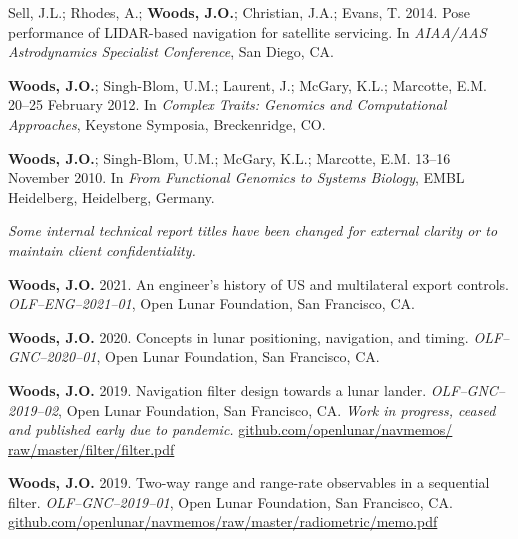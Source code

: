 \documentclass[12pt,letterpaper]{article}
\newcommand{\mhead}[1]{\leavevmode\marginpar{\sffamily\footnotesize #1}}
\begin{document}
\medskip
Sell, J.L.; Rhodes, A.; \textbf{Woods, J.O.}; Christian, J.A.; Evans, T. 2014. Pose performance of LIDAR-based navigation for satellite servicing. In \textit{AIAA/AAS Astrodynamics Specialist Conference}, San Diego, CA.

\bigskip
\mhead{Posters}%
\par\vspace{-\baselineskip}\textbf{Woods, J.O.}; Singh-Blom, U.M.; Laurent, J.; McGary, K.L.; Marcotte, E.M. 20--25 February 2012. In \textit{Complex Traits: Genomics and Computational Approaches}, Keystone Symposia, Breckenridge, CO.

\medskip
\par \textbf{Woods, J.O.}; Singh-Blom, U.M.; McGary, K.L.; Marcotte, E.M. 13--16 November 2010. In \textit{From Functional Genomics to Systems Biology},  EMBL Heidelberg, Heidelberg, Germany.

\bigskip
\mhead{Technical \newline Reports}%
\par\vspace{-\baselineskip}\textit{Some internal technical report titles have been changed for external clarity or to maintain client confidentiality.}

\medskip
\par\textbf{Woods, J.O.} 2021. An engineer's history of US and multilateral export controls. \textit{OLF--ENG--2021--01}, Open Lunar Foundation, San Francisco, CA.

\medskip
\par\textbf{Woods, J.O.} 2020. Concepts in lunar positioning, navigation, and timing. \textit{OLF--GNC--2020--01}, Open Lunar Foundation, San Francisco, CA.

\medskip
\par\textbf{Woods, J.O.} 2019. Navigation filter design towards a lunar lander. \textit{OLF--GNC--2019--02}, Open Lunar Foundation, San Francisco, CA. \textit{Work in progress, ceased and published early due to pandemic.} \href{https://github.com/openlunar/navmemos/raw/master/filter/filter.pdf}{github.com/openlunar/navmemos/ raw/master/filter/filter.pdf}

\medskip
\par\textbf{Woods, J.O.} 2019. Two-way range and range-rate observables in a sequential filter. \textit{OLF--GNC--2019--01}, Open Lunar Foundation, San Francisco, CA. \href{https://github.com/openlunar/navmemos/raw/master/radiometric/memo.pdf}{github.com/openlunar/navmemos/raw/master/radiometric/memo.pdf}
\end{document}
